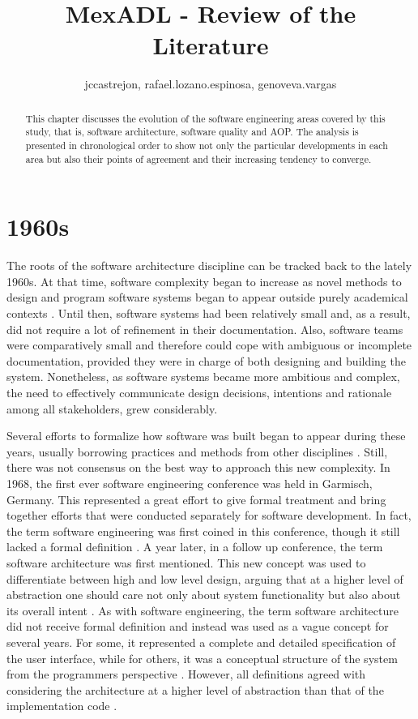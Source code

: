\documentclass[10pt]{article}
\title{MexADL - Review of the Literature}
\author{jccastrejon, rafael.lozano.espinosa, genoveva.vargas}
\begin{document}
\maketitle

\begin{abstract}
This chapter discusses the evolution of the software engineering areas covered by this study, that is, software architecture, software quality and AOP. The analysis is presented in chronological order to show not only the particular developments in each area but also their points of agreement and their increasing tendency to converge.
\end{abstract}


\section{1960s}

The roots of the software architecture discipline can be tracked back to the lately 1960s. At that time, software complexity began to increase as novel methods to design and program software systems began to appear outside purely academical contexts \cite{Barroca99}. Until then, software systems had been relatively small and, as a result, did not require a lot of refinement in their documentation. Also, software teams were comparatively small and therefore could cope with ambiguous or incomplete documentation, provided they were in charge of both designing and building the system. Nonetheless, as software systems became more ambitious and complex, the need to effectively communicate design decisions, intentions and rationale among all stakeholders, grew considerably.

Several efforts to formalize how software was built began to appear during these years, usually borrowing practices and methods from other disciplines \cite{Randell79}. Still, there was not consensus on the best way to approach this new complexity. In 1968, the first ever software engineering conference was held in Garmisch, Germany. This represented a great effort to give formal treatment and bring together efforts that were conducted separately for software development. In fact, the term software engineering was first coined in this conference, though it still lacked a formal definition \cite{Randell79}. A year later, in a follow up conference, the term software architecture was first mentioned. This new concept was used to differentiate between high and low level design, arguing that at a higher level of abstraction one should care not only about system functionality but also about its overall intent \cite{Randell70}. As with software engineering, the term software architecture did not receive formal definition and instead was used as a vague concept for several years. For some, it represented a complete and detailed specification of the user interface, while for others, it was a conceptual structure of the system from the programmers perspective \cite{Brooks75}. However, all definitions agreed with considering the architecture at a higher level of abstraction than that of the implementation code \cite{Barroca99}.
\end{document}
